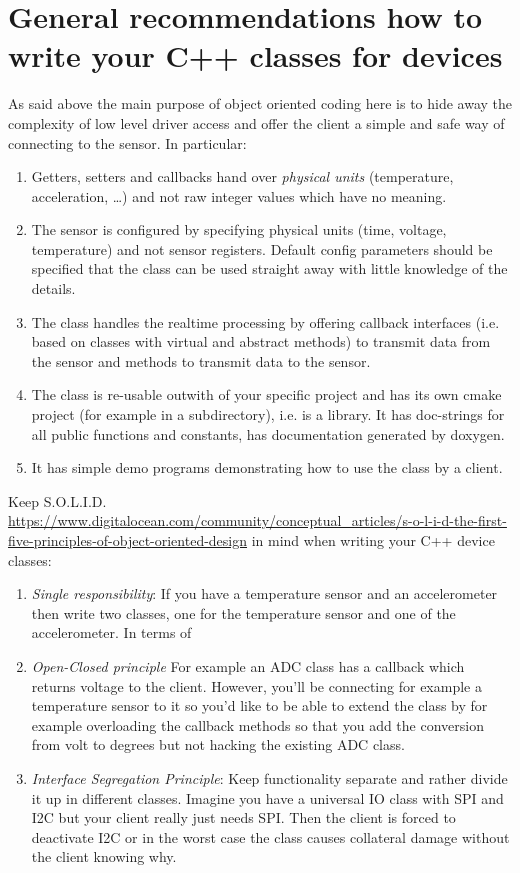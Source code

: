 \documentclass[12pt]{report}
\begin{document}
\section{General recommendations how to write your C++ classes for devices}
As said above the main purpose of object oriented coding here is to
hide away the complexity of low level driver access and offer the
client a simple and safe way of connecting to the sensor. In
particular:
\begin{enumerate}
\item Getters, setters and callbacks hand over \textsl{physical units}
  (temperature, acceleration, \ldots) and not raw integer values which
  have no meaning.
\item The sensor is configured by specifying physical units (time,
  voltage, temperature) and not sensor registers. Default config parameters
  should be specified that the class can be used straight away
  with little knowledge of the details.
\item The class handles the realtime processing by offering callback
  interfaces (i.e. based on classes with virtual and abstract methods)
  to transmit data from the sensor and methods to transmit data to the sensor.
\item The class is re-usable outwith of your specific project and has
  its own cmake project (for example in a subdirectory), i.e. is a
  library. It has doc-strings for all public functions and constants,
  has documentation generated by doxygen.
\item It has simple demo programs demonstrating how to use the class by a client.
\end{enumerate}

Keep S.O.L.I.D. \url{https://www.digitalocean.com/community/conceptual_articles/s-o-l-i-d-the-first-five-principles-of-object-oriented-design}
in mind when writing your C++ device classes:
\begin{enumerate}
\item \textsl{Single responsibility}: If you have a temperature
sensor and an accelerometer then write two classes, one for the
temperature sensor and one of the accelerometer. In terms of
\item \textsl{Open-Closed principle} For example an ADC class
  has a callback which returns voltage to the client. However,
  you'll be connecting for example a temperature sensor to
  it so you'd like to be able to extend the class by for example
  overloading the callback methods so that you add the conversion
  from volt to degrees but not hacking the existing ADC class.
\item \textsl{Interface Segregation Principle}:
  Keep functionality separate and rather divide it up in different
  classes. Imagine you have a universal IO class with SPI and I2C
  but your client really just needs SPI. Then the client is forced
  to deactivate I2C or in the worst case the class causes collateral
  damage without the client knowing why.
\end{enumerate}
\end{document}

